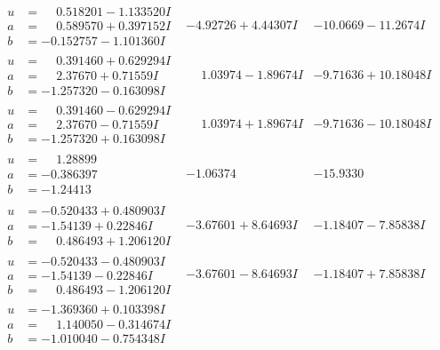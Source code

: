 \documentclass[1p]{elsarticle_modified}
\theoremstyle{definition}
\begin{document}
$$\begin{array}{c|c|c}
\begin{aligned}
u &= \phantom{-}0.518201 - 1.133520 I \\
a &= \phantom{-}0.589570 + 0.397152 I \\
b &= -0.152757 - 1.101360 I\end{aligned}
 & -4.92726 + 4.44307 I & -10.0669 - 11.2674 I \\ \hline\begin{aligned}
u &= \phantom{-}0.391460 + 0.629294 I \\
a &= \phantom{-}2.37670 + 0.71559 I \\
b &= -1.257320 - 0.163098 I\end{aligned}
 & \phantom{-}1.03974 - 1.89674 I & -9.71636 + 10.18048 I \\ \hline\begin{aligned}
u &= \phantom{-}0.391460 - 0.629294 I \\
a &= \phantom{-}2.37670 - 0.71559 I \\
b &= -1.257320 + 0.163098 I\end{aligned}
 & \phantom{-}1.03974 + 1.89674 I & -9.71636 - 10.18048 I \\ \hline\begin{aligned}
u &= \phantom{-}1.28899\phantom{ +0.000000I} \\
a &= -0.386397\phantom{ +0.000000I} \\
b &= -1.24413\phantom{ +0.000000I}\end{aligned}
 & -1.06374\phantom{ +0.000000I} & -15.9330\phantom{ +0.000000I} \\ \hline\begin{aligned}
u &= -0.520433 + 0.480903 I \\
a &= -1.54139 + 0.22846 I \\
b &= \phantom{-}0.486493 + 1.206120 I\end{aligned}
 & -3.67601 + 8.64693 I & -1.18407 - 7.85838 I \\ \hline\begin{aligned}
u &= -0.520433 - 0.480903 I \\
a &= -1.54139 - 0.22846 I \\
b &= \phantom{-}0.486493 - 1.206120 I\end{aligned}
 & -3.67601 - 8.64693 I & -1.18407 + 7.85838 I \\ \hline\begin{aligned}
u &= -1.369360 + 0.103398 I \\
a &= \phantom{-}1.140050 - 0.314674 I \\
b &= -1.010040 - 0.754348 I\end{aligned}

\end{array}$$
\end{document}

